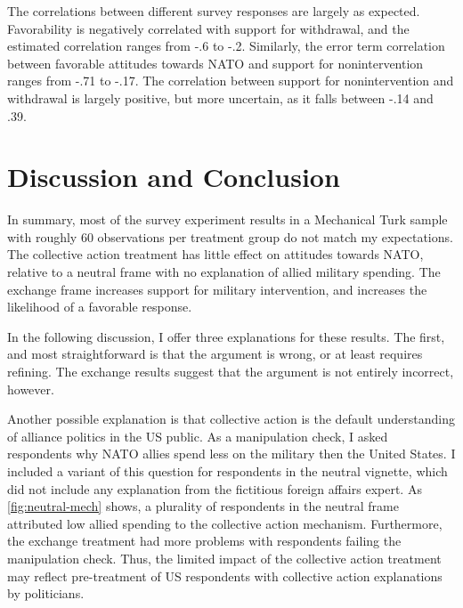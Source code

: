 \documentclass[12pt]{article}
\begin{document}
The correlations between different survey responses are largely as expected.
Favorability is negatively correlated with support for withdrawal, and the estimated correlation ranges from -.6 to -.2. 
Similarly, the error term correlation between favorable attitudes towards NATO and support for nonintervention ranges from -.71 to -.17.
The correlation between support for nonintervention and withdrawal is largely positive, but more uncertain, as it falls between -.14 and .39. 



\section{Discussion and Conclusion} 


In summary, most of the survey experiment results in a Mechanical Turk sample with roughly 60 observations per treatment group do not match my expectations. 
The collective action treatment has little effect on attitudes towards NATO, relative to a neutral frame with no explanation of allied military spending. 
The exchange frame increases support for military intervention, and increases the likelihood of a favorable response. 


In the following discussion, I offer three explanations for these results. 
The first, and most straightforward is that the argument is wrong, or at least requires refining. 
The exchange results suggest that the argument is not entirely incorrect, however. 


Another possible explanation is that collective action is the default understanding of alliance politics in the US public. 
As a manipulation check, I asked respondents why NATO allies spend less on the military then the United States. 
I included a variant of this question for respondents in the neutral vignette, which did not include any explanation from the fictitious foreign affairs expert. 
As \autoref{fig:neutral-mech} shows, a plurality of respondents in the neutral frame attributed low allied spending to the collective action mechanism. 
Furthermore, the exchange treatment had more problems with respondents failing the manipulation check. 
Thus, the limited impact of the collective action treatment may reflect pre-treatment of US respondents with collective action explanations by politicians. 
\end{document}
